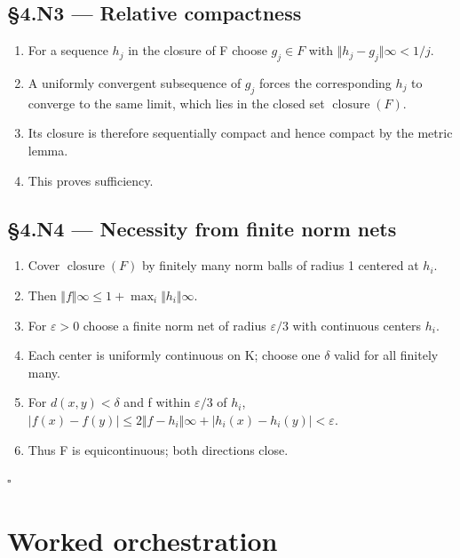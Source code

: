 \documentclass[preprint,12pt,aps,pra,showkeys,amsmath,amssymb,superscriptaddress,floatfix]{revtex4-2}
\theoremstyle{definition}
\theoremstyle{remark}
\begin{document}
\subsection{§4.N3 --- Relative
compactness}\label{n3-relative-compactness}

\begin{enumerate}
\def\labelenumi{\arabic{enumi}.}
\item
  For a sequence \(h_j\) in the closure of F choose \(g_j\in F\) with
  \(\Vert h_j-g_j\Vert \infty <1/j\).
\item
  A uniformly convergent subsequence of \(g_j\) forces the corresponding
  \(h_j\) to converge to the same limit, which lies in the closed set
  \(\operatorname{closure} (F)\).
\item
  Its closure is therefore sequentially compact and hence compact by the
  metric lemma.
\item
  This proves sufficiency.
\end{enumerate}

\subsection{§4.N4 --- Necessity from finite norm
nets}\label{n4-necessity-from-finite-norm-nets}

\begin{enumerate}
\def\labelenumi{\arabic{enumi}.}
\item
  Cover \(\operatorname{closure} (F)\) by finitely many norm balls of
  radius 1 centered at \(h_i\).
\item
  Then
  \(\Vert f\Vert \infty \le 1+\operatorname{max} _i\Vert h_i\Vert \infty\).
\item
  For \(\varepsilon >0\) choose a finite norm net of radius
  \(\varepsilon /3\) with continuous centers \(h_i\).
\item
  Each center is uniformly continuous on K; choose one \(\delta\) valid
  for all finitely many.
\item
  For \(d(x,y)<\delta\) and f within \(\varepsilon /3\) of \(h_i\),
  \(|f(x)-f(y)|\le 2\Vert f-h_i\Vert \infty +|h_i(x)-h_i(y)|<\varepsilon\).
\item
  Thus F is equicontinuous; both directions close.
\end{enumerate}

\hfill$\square$

\section{Worked orchestration}
\end{document}
